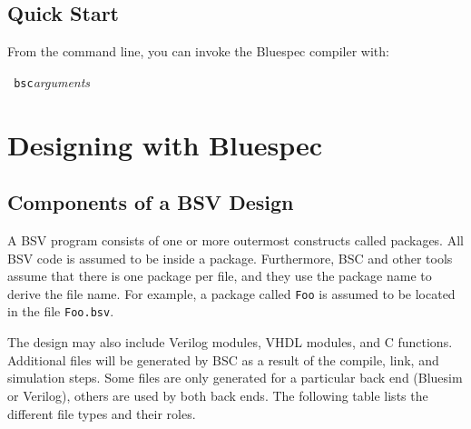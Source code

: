 \documentclass{article}
\newenvironment{smbox}[1][2.5 in]
  {\begin{lrbox}{\fminibox}\begin{minipage}[c]{2.5 in}}
  {\end{minipage}\end{lrbox}\fbox{\usebox{\fminibox}}}
\begin{document}

\subsection{Quick Start}

From the command line, you can invoke the Bluespec compiler with:

\begin{center}
\begin{smbox}
{\tt \hspace*{2em} bsc}\hspace*{2em}\emph{arguments}
\end{smbox}
\end{center}


\section{Designing with Bluespec}


\subsection{Components of a BSV Design}

A BSV program consists of one or more outermost constructs called
packages.  All BSV code is assumed to be inside a package.  Furthermore,
BSC and other tools assume that there is one package per
file, and they use the package name to derive the file name.  For
example, a package called \texttt{Foo} is assumed to be located in the file
\texttt{Foo.bsv}.

The design may also include Verilog modules, VHDL modules, and C functions.
Additional files will be generated by BSC as a result of the compile, link,
and simulation steps.
 Some files are only generated for a
particular back end (Bluesim or Verilog), others are used by both
back ends.  The following table lists the different
file types and their roles.
\end{document}
